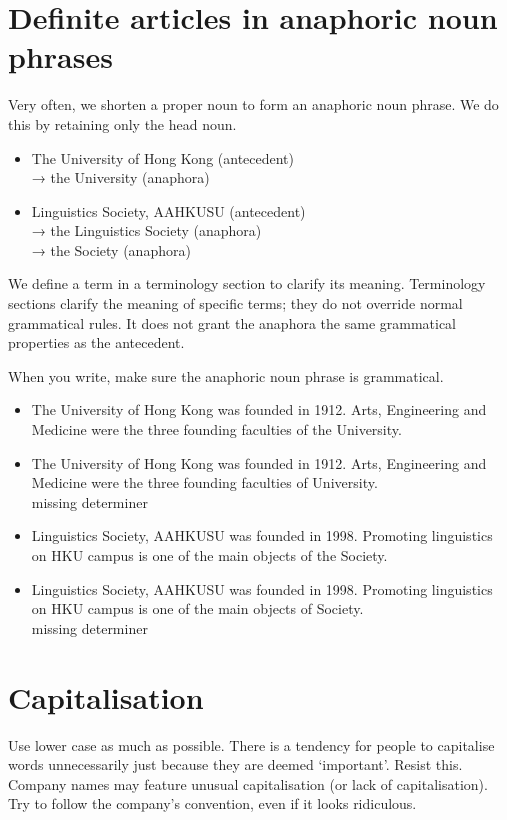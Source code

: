 \documentclass[11pt,a4paper]{book}
\newcommand{\xmark}{{\color{cadmiumred}\ding{54}}}%
\newcommand{\cmark}{{\color{green(html/cssgreen)}\checkmark}}%
\begin{document}
	\chapter{Definite articles in anaphoric noun phrases}
	Very often, we shorten a proper noun to form an anaphoric noun phrase. We do this by retaining only the head noun.
		{\firasans \begin{mdframed}[backgroundcolor=aliceblue] \begin{itemize}[label=\cmark]
			\item The University of Hong Kong (antecedent)\\ → the University (anaphora)
			\item Linguistics Society, AAHKUSU (antecedent)\\ → the Linguistics Society (anaphora)\\ → the Society (anaphora)
		\end{itemize} \end{mdframed} }
		We define a term in a terminology section to clarify its meaning. Terminology sections clarify the meaning of specific terms; they do not override normal grammatical rules. It does not grant the anaphora the same grammatical properties as the antecedent.\par
		When you write, make sure the anaphoric noun phrase is grammatical.
		{\firasans \begin{mdframed}[backgroundcolor=aliceblue] \begin{itemize}[label=\cmark]
			\item The University of Hong Kong was founded in 1912. Arts, Engineering and Medicine were the three founding faculties of the University.
			\item[\xmark] The University of Hong Kong was founded in 1912. Arts, Engineering and Medicine were the three founding faculties of University.\\
			\lbrack missing determiner\rbrack
			\item Linguistics Society, AAHKUSU was founded in 1998. Promoting linguistics on HKU campus is one of the main objects of the Society.
			\item[\xmark] Linguistics Society, AAHKUSU was founded in 1998. Promoting linguistics on HKU campus is one of the main objects of Society.\\
			\lbrack missing determiner\rbrack
		\end{itemize} \end{mdframed} }
	\chapter{Capitalisation}
	Use lower case as much as possible. There is a tendency for people to capitalise words unnecessarily just because they are deemed `important'. Resist this. Company names may feature unusual capitalisation (or lack of capitalisation). Try to follow the company's convention, even if it looks ridiculous. 
\end{document}
